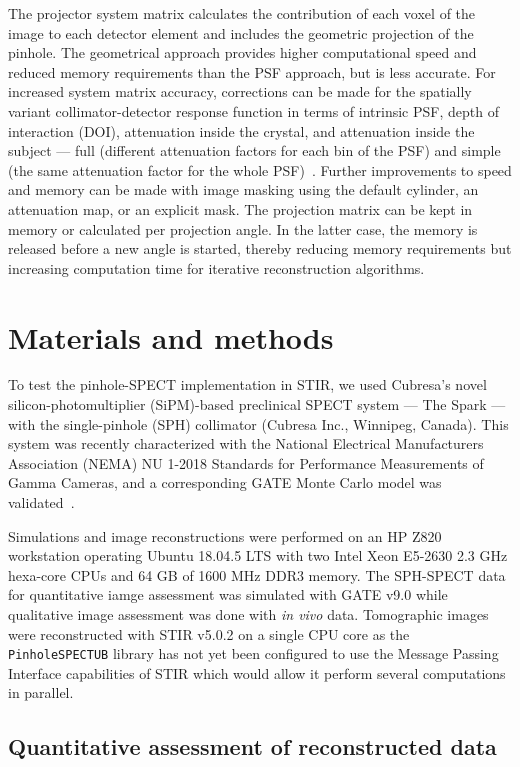 \documentclass[utf8]{FrontiersinHarvard} %
\begin{document}
The projector system matrix calculates the contribution of each voxel of the image to each detector element and includes the geometric projection of the pinhole. The geometrical approach provides higher computational speed and reduced memory requirements than the PSF approach, but is less accurate. For increased system matrix accuracy, corrections can be made for the spatially variant collimator-detector response function in terms of intrinsic PSF, depth of interaction (DOI), attenuation inside the crystal, and attenuation inside the subject --- full (different attenuation factors for each bin of the PSF) and simple (the same attenuation factor for the whole PSF)~\cite{fuster_2014}. Further improvements to speed and memory can be made with image masking using the default cylinder, an attenuation map, or an explicit mask. The projection matrix can be kept in memory or calculated per projection angle. In the latter case, the memory is released before a new angle is started, thereby reducing memory requirements but increasing computation time for iterative reconstruction algorithms.


\section{Materials and methods}

To test the pinhole-SPECT implementation in STIR, we used Cubresa's novel silicon-photomultiplier (SiPM)-based preclinical SPECT system --- The Spark --- with the single-pinhole (SPH) collimator (Cubresa Inc., Winnipeg, Canada). This system was recently characterized with the National Electrical Manufacturers Association (NEMA) NU 1-2018 Standards for Performance Measurements of Gamma Cameras, and a corresponding GATE Monte Carlo model was validated~\cite{strugari_nema_2022}.

Simulations and image reconstructions were performed on an HP Z820 workstation operating Ubuntu 18.04.5 LTS with two Intel Xeon E5-2630 2.3 GHz hexa-core CPUs and 64 GB of 1600 MHz DDR3 memory. The SPH-SPECT data for quantitative iamge assessment was simulated with GATE v9.0 while qualitative image assessment was done with \textit{in vivo} data. Tomographic images were reconstructed with STIR v5.0.2 on a single CPU core as the \texttt{PinholeSPECTUB} library has not yet been configured to use the Message Passing Interface capabilities of STIR which would allow it perform several computations in parallel.

\subsection{Quantitative assessment of reconstructed data}
\end{document}
